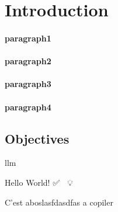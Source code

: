 \section{Introduction}

\paragraph{paragraph1}
\paragraph{paragraph2}
\paragraph{paragraph3}
\paragraph{paragraph4}

\subsection{Objectives}
\label{sec:objectives}

\gls{llm}

Hello World! {\emojifont ✅ 🚀 💡}

\cite{agarwal2024llmreasoningplanningsupportingincompleteuser}

C'est aboslasfdasdfas a copiler
